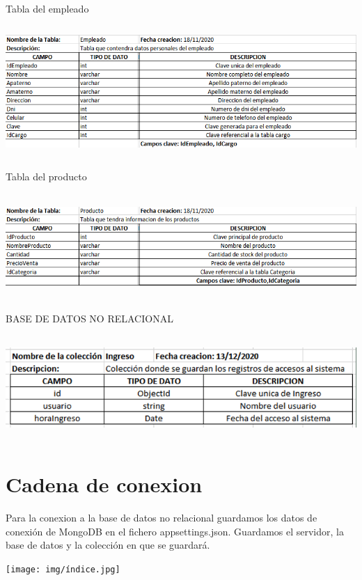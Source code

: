 \documentclass[12pt,letterpaper]{article}
\begin{document}
Tabla del empleado
\begin{center}
    \includegraphics[width=14cm, height=5cm]{img/empleado.png}  
\end{center}
\newpage
Tabla del producto
\begin{center}
    \includegraphics[width=14cm, height=4cm]{img/producto.png}  
\end{center}

BASE DE DATOS NO RELACIONAL\\
\begin{center}
    \includegraphics[width=14cm, height=4cm]{img/DatosNo.png}  
\end{center}
\section{Cadena de conexion }

Para la conexion a la base de datos no relacional guardamos los datos de conexión de MongoDB en el fichero appsettings.json. Guardamos el servidor, la base de datos y la colección en que se guardará.

\begin{center}
    \texttt{[image: img/índice.jpg]}  
\end{center}
\end{document}
